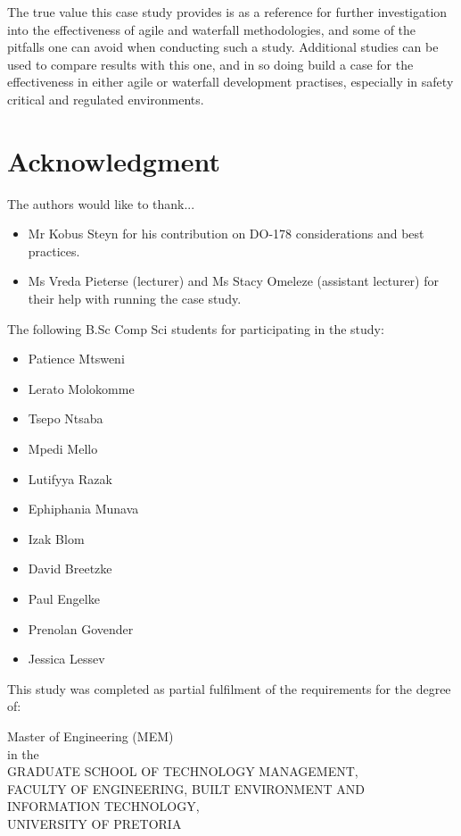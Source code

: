 \documentclass{sig-alternate-05-2015}
\begin{document}
The true value this case study provides is as a reference for further investigation into the effectiveness of agile and waterfall methodologies, and some of the pitfalls one can avoid when conducting such a study. Additional studies can be used to compare results with this one, and in so doing build a case for the effectiveness in either agile or waterfall development practises, especially in safety critical and regulated environments. 



\section*{Acknowledgment}


The authors would like to thank...

\begin{itemize}
	\item Mr Kobus Steyn for his contribution on DO-178 considerations and best practices.
	\item Ms Vreda Pieterse (lecturer) and Ms Stacy Omeleze (assistant lecturer) for their help with running the case study.
\end{itemize}

The following B.Sc Comp Sci students for participating in the study:
\begin{itemize}
	\item Patience Mtsweni
	\item Lerato Molokomme
	\item Tsepo Ntsaba
	\item Mpedi Mello
	\item Lutifyya Razak
	\item Ephiphania Munava
	\item Izak Blom
	\item David Breetzke
	\item Paul Engelke
	\item Prenolan Govender
	\item Jessica Lessev
	\\ 
\end{itemize}
This study was completed as partial fulfilment of the requirements for the degree of: \\
\begin{center}Master of Engineering (MEM)\\
in the\\

GRADUATE SCHOOL OF TECHNOLOGY MANAGEMENT,\\
FACULTY OF ENGINEERING, BUILT ENVIRONMENT AND INFORMATION TECHNOLOGY,\\
UNIVERSITY OF PRETORIA
\end{center}


  

\end{document}
